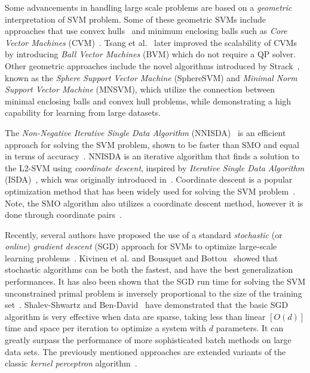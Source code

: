 \documentclass[reqno]{vcuthesis}
\numberwithin{equation}{chapter}
\begin{document}
Some advancements in handling large scale problems are based on a \textit{geometric} interpretation of SVM problem. Some of these geometric SVMs include approaches that use convex hulls~\cite{bennett2000duality} and minimum enclosing balls such as \textit{Core Vector Machines} (CVM)~\cite{tsang2005core}. Tsang et al.~\cite{tsang2007simpler} later improved the scalability of CVMs by introducing \textit{Ball Vector Machines} (BVM) which do not require a QP solver. Other geometric approaches include the novel algorithms introduced by Strack~\cite{strack2013geometric}, known as the \textit{Sphere Support Vector Machine} (SphereSVM) and \textit{Minimal Norm Support Vector Machine} (MNSVM), which utilize the connection between minimal enclosing balls and convex hull problems, while demonstrating a high capability for learning from large datasets. 

The \textit{Non-Negative Iterative Single Data Algorithm} (NNISDA)~\cite{zigic2016} is an efficient approach for solving the SVM problem, shown to be faster than SMO and equal in terms of accuracy~\cite{Kecman2014}. NNISDA is an iterative algorithm that finds a solution to the L2-SVM using \textit{coordinate descent}, inspired by \textit{Iterative Single Data Algorithm} (ISDA)~\cite{Huang2006}, which was originally introduced in~\cite{Kecman2005}. Coordinate descent is a popular optimization method that has been widely used for solving the SVM problem~\cite{bordes2007solving,frie1998kernel,hsieh2008dual,mangasarian1999successive}. Note, the SMO algorithm also utilizes a coordinate descent method, however it is done through coordinate pairs~\cite{shawe2011review}.

Recently, several authors have proposed the use of a standard \textit{stochastic} (or \textit{online}) \textit{gradient descent} (SGD) approach for SVMs to optimize large-scale learning problems~\cite{herbrich2016learning,kivinen2002large,Schoelkopf2002,Shalev2014,shalev2011pegasos}. Kivinen et al.\cite{kivinen2004online} and Bousquet and Bottou~\cite{bousquet2008tradeoffs} showed that stochastic algorithms can be both the fastest, and have the best generalization performances. It has also been shown that the SGD run time for solving the SVM unconstrained primal problem is inversely proportional to the size of the training set~\cite{panagiotakopoulos2013stochastic,shalev2008svm}. Shalev-Shwartz and Ben-David~\cite{Shalev2014} have demonstrated that the basic SGD algorithm is very effective when data are sparse, taking less than linear $[O(d)]$ time and space per iteration to optimize a system with $d$ parameters. It can greatly surpass the performance of more sophisticated batch methods on large data sets. The previously mentioned approaches are extended variants of the classic \textit{kernel perceptron} algorithm~\cite{collobert2004links}. 
\end{document}
